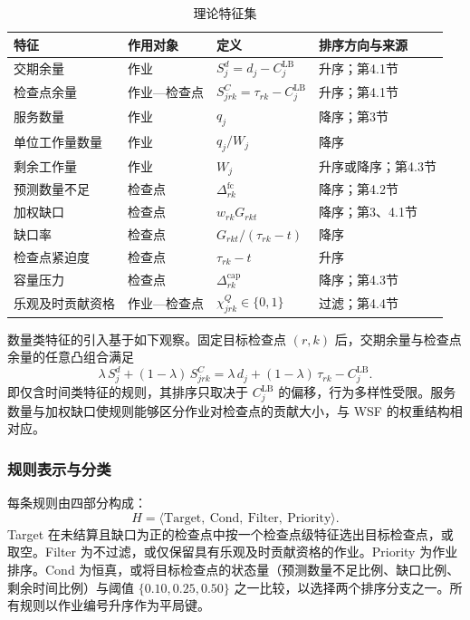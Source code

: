 \documentclass[12pt,a4paper]{article}
\begin{document}
\begin{table}[t]
  \centering
  \caption{理论特征集}\label{tab:theory}
  \small
  \begin{tabular}{@{}>{\raggedright}p{3.4cm}>{\raggedright}p{2.0cm}>{\raggedright}p{4.6cm}>{\raggedright\arraybackslash}p{3.8cm}@{}}
    \toprule
    特征 & 作用对象 & 定义 & 排序方向与来源 \\
    \midrule
    交期余量 & 作业 & $S^{d}_j=d_j-C^{\mathrm{LB}}_j$ & 升序；第4.1节 \\
    检查点余量 & 作业—检查点 & $S^{C}_{jrk}=\tau_{rk}-C^{\mathrm{LB}}_j$ & 升序；第4.1节 \\
    服务数量 & 作业 & $q_j$ & 降序；第3节 \\
    单位工作量数量 & 作业 & $q_j/W_j$ & 降序 \\
    剩余工作量 & 作业 & $W_j$ & 升序或降序；第4.3节 \\
    预测数量不足 & 检查点 & $\Delta^{\mathrm{fc}}_{rk}$ & 降序；第4.2节 \\
    加权缺口 & 检查点 & $w_{rk}G_{rkt}$ & 降序；第3、4.1节 \\
    缺口率 & 检查点 & $G_{rkt}/(\tau_{rk}-t)$ & 降序 \\
    检查点紧迫度 & 检查点 & $\tau_{rk}-t$ & 升序 \\
    容量压力 & 检查点 & $\Delta^{\mathrm{cap}}_{rk}$ & 降序；第4.3节 \\
    乐观及时贡献资格 & 作业—检查点 & $\chi^{Q}_{jrk}\in\{0,1\}$ & 过滤；第4.4节 \\
    \bottomrule
  \end{tabular}
\end{table}

数量类特征的引入基于如下观察。固定目标检查点 $(r,k)$ 后，交期余量与检查点余量的任意凸组合满足
\begin{equation}\label{eq:blend}
  \lambda\,S^{d}_j+(1-\lambda)\,S^{C}_{jrk}=\lambda\,d_j+(1-\lambda)\,\tau_{rk}-C^{\mathrm{LB}}_j .
\end{equation}
即仅含时间类特征的规则，其排序只取决于 $C^{\mathrm{LB}}_j$ 的偏移，行为多样性受限。服务数量与加权缺口使规则能够区分作业对检查点的贡献大小，与 WSF 的权重结构相对应。

\subsubsection{规则表示与分类}

每条规则由四部分构成：
\begin{equation}\label{eq:rule}
  H=\langle\mathrm{Target},\ \mathrm{Cond},\ \mathrm{Filter},\ \mathrm{Priority}\rangle .
\end{equation}
Target 在未结算且缺口为正的检查点中按一个检查点级特征选出目标检查点，或取空。Filter 为不过滤，或仅保留具有乐观及时贡献资格的作业。Priority 为作业排序。Cond 为恒真，或将目标检查点的状态量（预测数量不足比例、缺口比例、剩余时间比例）与阈值 $\{0.10,0.25,0.50\}$ 之一比较，以选择两个排序分支之一。所有规则以作业编号升序作为平局键。
\end{document}

